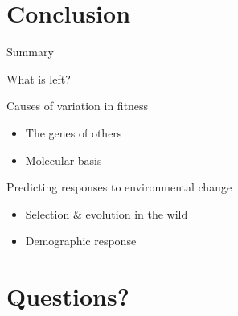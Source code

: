 \documentclass[10pt]{beamer}%
\begin{document}
\section{Conclusion}
\begin{frame}{Summary}
	
\end{frame}
\begin{frame}{What is left?}
	\begin{exampleblock}{Causes of variation in fitness}
		\begin{itemize}
			\item The genes of others
			\item Molecular basis
		\end{itemize}
	\end{exampleblock}
	\begin{exampleblock}{Predicting responses to environmental change}
		\begin{itemize}
			\item Selection \& evolution in the wild
			\item Demographic response
		\end{itemize}
	\end{exampleblock}
\end{frame}

\section{Questions?}
\end{document}
